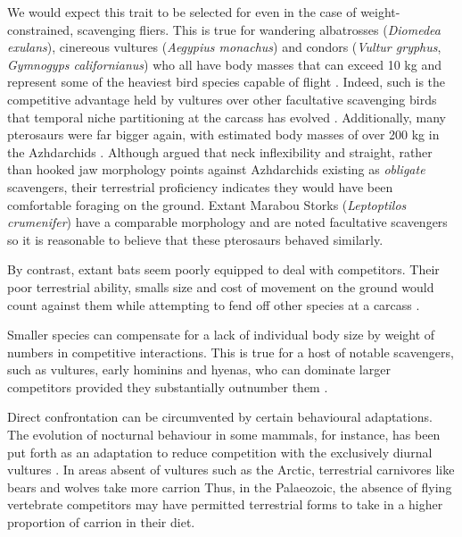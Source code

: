 \documentclass[a4paper,12pt]{article}
\begin{document}
We would expect this trait to be selected for even in the case of weight-constrained, scavenging fliers.
This is true for wandering albatrosses (\textit{Diomedea exulans}), cinereous vultures (\textit{Aegypius monachus}) and condors (\textit{Vultur gryphus}, \textit{Gymnogyps californianus}) who all have body masses that can exceed 10 kg and represent some of the heaviest bird species capable of flight \citep{weimerskirch1992reproductive,ferguson2001raptors,donazar2002effects}.
Indeed, such is the competitive advantage held by vultures over other facultative scavenging birds that temporal niche partitioning at the carcass has evolved \citep{kendall2013alternative,KaneVul}. 
Additionally, many pterosaurs were far bigger again, with estimated body masses of over 200 kg in the Azhdarchids \citep{witton2010size}.
Although \cite{witton2008reappraisal} argued that neck inflexibility and straight, rather than hooked jaw morphology points against Azhdarchids existing as \textit{obligate} scavengers, their terrestrial proficiency indicates they would have been comfortable foraging on the ground.
Extant Marabou Storks (\textit{Leptoptilos crumenifer}) have a comparable morphology and are noted facultative scavengers \citep{monadjem2012survival} so it is reasonable to believe that these pterosaurs behaved similarly.

By contrast, extant bats seem poorly equipped to deal with competitors. 
Their poor terrestrial ability, smalls size and cost of movement on the ground would count against them while attempting to fend off other species at a carcass \citep{riskin2006terrestrial,voigt2012terrestrial}.


Smaller species can compensate for a lack of individual body size by weight of numbers in competitive interactions. 
This is true for a host of notable scavengers, such as vultures, early hominins and hyenas, who can dominate larger competitors provided they substantially outnumber them \citep{KaneVul,trinkel2005competitive,ruxton2013endurance}. 

Direct confrontation can be circumvented by certain behavioural adaptations. 
The evolution of nocturnal behaviour in some mammals, for instance, has been put forth as an adaptation to reduce competition with the exclusively diurnal vultures \citep{gittleman2013carnivore}. 
In areas absent of vultures such as the Arctic, terrestrial carnivores like bears and wolves take more carrion \citep{devault2003scavenging}
Thus, in the Palaeozoic, the absence of flying vertebrate competitors may have permitted terrestrial forms to take in a higher proportion of carrion in their diet.
\end{document}
